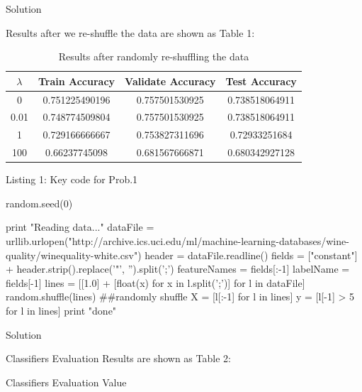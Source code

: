 \documentclass{assignment}
\date{February 5, 2017}
\begin{document}
\begin{problemlist}




\pbitem Solution


\begin{table}[h]
Results after we re-shuffle the data are shown as Table 1:

\vspace{2ex}
\centering
\caption{Results after randomly re-shuffling the data}
\vspace{1ex}

\begin{tabular}{|c|c|c|c|}
\hline
$\lambda$ & Train Accuracy & Validate Accuracy & Test Accuracy \\
\hline
0 & 0.751225490196 & 0.757501530925 & 0.738518064911  \\
\hline
0.01 & 0.748774509804 & 0.757501530925 & 0.738518064911  \\
\hline
1 & 0.729166666667 & 0.753827311696 & 0.72933251684 \\
\hline
100 & 0.66237745098 & 0.681567666871 & 0.680342927128  \\
\hline
\end{tabular}
\end{table}


\vspace{2ex}
\begin{center} 
Listing 1: Key code for Prob.1
\end{center}
\begin{python}
random.seed(0)

print "Reading data..."
dataFile = urllib.urlopen("http://archive.ics.uci.edu/ml/machine-learning-databases/wine-quality/winequality-white.csv")
header = dataFile.readline()
fields = ["constant"] + header.strip().replace('"', '').split(';')
featureNames = fields[:-1]
labelName = fields[-1]
lines = [[1.0] + [float(x) for x in l.split(';')] for l in dataFile]
random.shuffle(lines)        ##randomly shuffle
X = [l[:-1] for l in lines]
y = [l[-1] > 5 for l in lines]
print "done"
\end{python}

\vspace{3ex}

\pbitem Solution
\vspace{30ex}
\begin{table}[h]
Classifiers Evaluation Results are shown as Table 2:

\vspace{2ex}
\centering
\caption{Classifiers Evaluation Value}
\vspace{1ex}


\end{table}
\end{problemlist}
\end{document}
